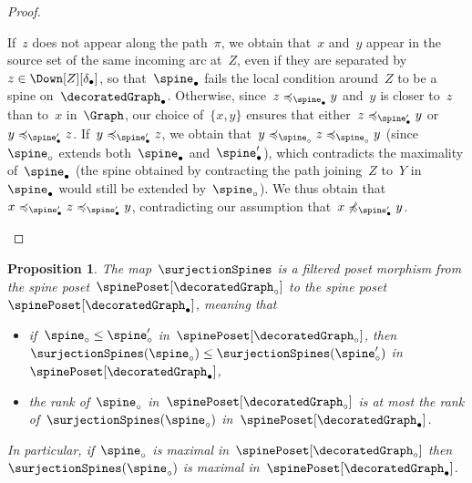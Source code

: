\documentclass{amsart}
\newtheorem{proposition}[theorem]{Proposition}
\theoremstyle{definition}
\newcommand{\decoration}{\delta}
\begin{document}
\begin{proof}
\begin{enumerate}[(i)]
    If~$z$ does not appear along the path~$\pi$, we obtain that~$x$ and~$y$ appear in the source set of the same incoming arc at~$Z$, even if they are separated by~$z \in \Down[Z][\decoration_\bullet]$, so that~$\spine_\bullet$ fails the local condition around~$Z$ to be a spine on~$\decoratedGraph_\bullet$.
    Otherwise, since~$z \preccurlyeq_{\spine_\bullet} y$ and~$y$ is closer to~$z$ than to~$x$ in~$\Graph$, our choice of~$\{x,y\}$ ensures that either~$z \preccurlyeq_{\spine_\bullet'} y$ or~$y \preccurlyeq_{\spine_\bullet'} z$.
    If~$y \preccurlyeq_{\spine_\bullet'} z$, we obtain that~$y \preccurlyeq_{\spine_\circ} z \preccurlyeq_{\spine_\circ} y$ (since~$\spine_\circ$ extends both~$\spine_\bullet$ and~$\spine_\bullet'$), which contradicts the maximality of~$\spine_\bullet$ (the spine obtained by contracting the path joining~$Z$ to~$Y$ in~$\spine_\bullet$ would still be extended by~$\spine_\circ$).
    We thus obtain that~$x \preccurlyeq_{\spine_\bullet'} z \preccurlyeq_{\spine_\bullet'} y$, contradicting our assumption that~$x \not\preccurlyeq_{\spine_\bullet'} y$.
    \qedhere
  \end{enumerate}
\end{proof}

\begin{proposition}
  \label{prop:filteredRefinementSpines}
  The map~$\surjectionSpines$ is a filtered poset morphism from the spine poset~$\spinePoset[\decoratedGraph_\circ]$ to the spine poset~$\spinePoset[\decoratedGraph_\bullet]$, meaning that
  \begin{itemize}
    \item if~$\spine_\circ \le \spine_\circ'$ in~$\spinePoset[\decoratedGraph_\circ]$, then~$\surjectionSpines(\spine_\circ) \le \surjectionSpines(\spine_\circ')$ in~$\spinePoset[\decoratedGraph_\bullet]$,
    \item the rank of~$\spine_\circ$ in~$\spinePoset[\decoratedGraph_\circ]$ is at most the rank of~$\surjectionSpines(\spine_\circ)$ in~$\spinePoset[\decoratedGraph_\bullet]$.
  \end{itemize}
  In particular, if~$\spine_\circ$ is maximal in~$\spinePoset[\decoratedGraph_\circ]$ then~$\surjectionSpines(\spine_\circ)$ is maximal in~$\spinePoset[\decoratedGraph_\bullet]$.
\end{proposition}
\end{document}
